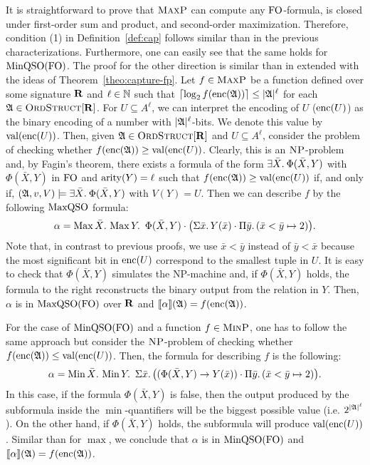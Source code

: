 It is straightforward to prove that $\text{\sc MaxP}$ can compute any ${\rm FO}$-formula, is closed under first-order sum and product, and second-order maximization. 
Therefore, condition (1) in Definition~\ref{def:cap} follows similar than in the previous characterizations. Furthermore, one can easily see that the same holds for ${\rm MinQSO}({\rm FO})$.
The proof for the other direction is similar than in \cite{kolaitis1994logical} extended with the ideas of Theorem~\ref{theo:capture-fp}. Let $f\in \text{\sc MaxP}$ be a function defined over some signature $\mathbf{R}$ and
$\ell\in\mathbb{N}$ such that $\lceil\log_2 f({\rm enc}(\mathfrak{A})) \rceil \leq |\mathfrak{A}|^\ell$ for each $\mathfrak{A}\in\text{\sc OrdStruct}[\mathbf{R}]$.
For $U \subseteq A^{\ell}$, we can interpret the encoding of $U$ (${\rm enc}(U)$) as the binary encoding of a number with $|\mathfrak{A}|^\ell$-bits. We denote this value by $\text{\rm val}({\rm enc}(U))$.
Then, given $\mathfrak{A}\in\text{\sc OrdStruct}[\mathbf{R}]$ and $U \subseteq A^{\ell}$, consider the problem of checking whether $f({\rm enc}(\mathfrak{A})) \geq \text{\rm val}({\rm enc}(U))$. 
Clearly, this is an $\text{\sc NP}$-problem and, by Fagin's theorem, there exists a formula of the form $\exists{\bar{X}}.\: \Phi(\bar{X}, Y)$ with $\Phi(\bar{X}, Y)$ in ${\rm FO}$ and ${\rm arity}(Y) = \ell$ such that $f({\rm enc}(\mathfrak{A})) \geq \text{\rm val}({\rm enc}(U))$ if, and only if, $(\mathfrak{A},v,V) \models \exists{\bar{X}}.\: \Phi(\bar{X}, Y)$ with $V(Y) = U$. 
Then we can describe $f$ by the following ${\rm MaxQSO}$ formula:
$$
\alpha = \maxa{\bar{X}} \maxa{Y} \ \Phi(\bar{X}, Y) \cdot \big( \sa{\bar{x}} Y(\bar{x}) \cdot \pa{\bar{y}}(\bar{x} < \bar{y} \mapsto 2) \big).
$$
Note that, in contrast to previous proofs, we use $\bar{x} < \bar{y}$ instead of $\bar{y} < \bar{x}$ because the most significant bit in ${\rm enc}(U)$ correspond to the smallest tuple in $U$.  
It is easy to check that $\Phi(\bar{X}, Y)$ simulates the NP-machine and, if $\Phi(\bar{X}, Y)$ holds, the formula to the right  reconstructs the binary output from the relation in $Y$.
Then, $\alpha$ is in ${\rm MaxQSO}({\rm FO})$ over $\mathbf{R}$ and ${\llbracket{}{\alpha}\rrbracket}(\mathfrak{A}) = f({\rm enc}(\mathfrak{A}))$. 

For the case of ${\rm MinQSO}({\rm FO})$ and a function $f \in \text{\sc MinP}$, one has to follow the same approach but consider the $\text{\sc NP}$-problem of checking whether $f({\rm enc}(\mathfrak{A})) \leq \text{\rm val}({\rm enc}(U))$. Then, the formula for describing $f$ is the following:
$$
\alpha = \operatorname{Min}{\bar{X}}.\, \operatorname{Min}{Y}.\, \ \Sigma{\bar{x}}.\, \big( (\Phi(\bar{X}, Y) \rightarrow Y(\bar{x})) \cdot \Pi{\bar{y}}.\,(\bar{x} < \bar{y} \mapsto 2)  \big).
$$
In this case, if the formula $\Phi(\bar{X}, Y)$ is false, then the output produced by the subformula inside the $\min$-quantifiers will be the biggest possible value (i.e. $2^{{|\mathfrak{A}|}^\ell}$).
On the other hand, if $\Phi(\bar{X}, Y)$ holds, the subformula will produce $\text{\rm val}({\rm enc}(U))$. 
Similar than for $\max$, we conclude that $\alpha$ is in ${\rm MinQSO}({\rm FO})$ and ${\llbracket{}{\alpha}\rrbracket}(\mathfrak{A}) = f({\rm enc}(\mathfrak{A}))$.